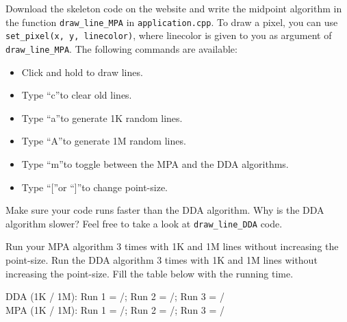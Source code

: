 \documentclass[12pt]{article}
\newcommand{\TODOL}[1]{\textcolor{red}{\underline{\hspace{#1 cm}}}}
\begin{document}
Download the skeleton code on the website and write the midpoint algorithm in
the function \texttt{draw\_line\_MPA} in \texttt{application.cpp}.  To draw a
pixel, you can use \texttt{set\_pixel(x, y, linecolor)}, where linecolor is
given to you as argument of \texttt{draw\_line\_MPA}.  The following commands
are available:

\begin{itemize}
\item
  {Click and hold to draw lines.}
\item
  {Type ``c''to clear old lines.}
\item
  {Type ``a''to generate 1K random lines.}
\item
  {Type ``A''to generate 1M random lines.}
\item
  {Type ``m''to toggle between the MPA and the DDA algorithms.}
\item
  {Type ``[''or ``]''to change point-size.}
\end{itemize}

Make sure your code runs faster than the DDA algorithm. Why is the DDA algorithm
slower? Feel free to take a look at \texttt{draw\_line\_DDA} code.

Run your MPA algorithm 3 times with 1K and 1M lines without increasing the
point-size. Run the DDA algorithm 3 times with 1K and 1M lines without
increasing the point-size. Fill the table below with the running time.

DDA (1K / 1M): Run 1 = \TODOL1/\TODOL1; Run 2 = \TODOL1/\TODOL1; Run 3 = \TODOL1/\TODOL1\\
MPA (1K / 1M): Run 1 = \TODOL1/\TODOL1; Run 2 = \TODOL1/\TODOL1; Run 3 = \TODOL1/\TODOL1
\end{document}
